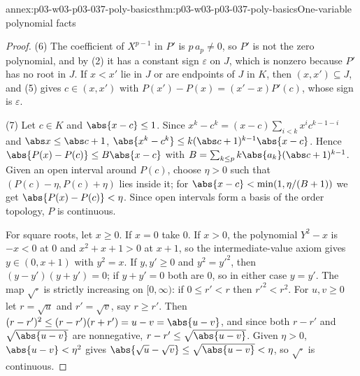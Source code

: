 \begin{annexitem}{annex:p03-w03-p03-037-poly-basics}{thm:p03-w03-p03-037-poly-basics}{One-variable polynomial facts}
\begin{proof}
(6) The coefficient of \(X^{p-1}\) in \(P'\) is \(p\,a_p\neq0\), so \(P'\) is
not the zero polynomial, and by (2) it has a constant sign \(\varepsilon\)
on \(J\), which is nonzero because \(P'\) has no root in \(J\).  If
\(x<x'\) lie in \(J\) or are endpoints of \(J\) in \(K\), then
\((x,x')\subseteq J\), and (5) gives \(c\in(x,x')\) with
\(P(x')-P(x)=(x'-x)P'(c)\), whose sign is \(\varepsilon\).

(7) Let \(c\in K\) and \(\abs{x-c}\leq1\).  Since
\(x^k-c^k=(x-c)\sum_{i<k}x^ic^{k-1-i}\) and \(\abs x\leq\abs c+1\),
\(\abs{x^k-c^k}\leq k(\abs c+1)^{k-1}\abs{x-c}\).  Hence
\(\abs{P(x)-P(c)}\leq B\abs{x-c}\) with
\(B=\sum_{k\leq p}k\abs{a_k}(\abs c+1)^{k-1}\).  Given an open interval
around \(P(c)\), choose \(\eta>0\) such that \((P(c)-\eta,P(c)+\eta)\) lies
inside it; for \(\abs{x-c}<\min(1,\eta/(B+1))\) we get
\(\abs{P(x)-P(c)}<\eta\).  Since open intervals form a basis of the order
topology, \(P\) is continuous.

For square roots, let \(x\geq0\).  If \(x=0\) take \(0\).  If \(x>0\), the
polynomial \(Y^2-x\) is \(-x<0\) at \(0\) and \(x^2+x+1>0\) at \(x+1\), so the
intermediate-value axiom gives \(y\in(0,x+1)\) with \(y^2=x\).  If
\(y,y'\geq0\) and \(y^2=y'^2\), then \((y-y')(y+y')=0\); if \(y+y'=0\) both
are \(0\), so in either case \(y=y'\).  The map \(\sqrt{\cdot}\) is strictly
increasing on \([0,\infty)\): if \(0\leq r'<r\) then \(r'^2<r^2\).  For
\(u,v\geq0\) let \(r=\sqrt u\) and \(r'=\sqrt v\), say \(r\geq r'\).  Then
\((r-r')^2\leq(r-r')(r+r')=u-v=\abs{u-v}\), and since both \(r-r'\) and
\(\sqrt{\abs{u-v}}\) are nonnegative, \(r-r'\leq\sqrt{\abs{u-v}}\).  Given
\(\eta>0\), \(\abs{u-v}<\eta^2\) gives
\(\abs{\sqrt u-\sqrt v}\leq\sqrt{\abs{u-v}}<\eta\), so \(\sqrt{\cdot}\) is
continuous.
\end{proof}
\end{annexitem}


